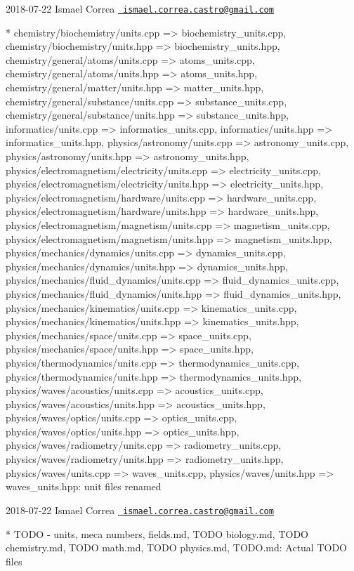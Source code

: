  2018-\/07-\/22 Ismael Correa \href{mailto:ismael.correa.castro@gmail.com}{\texttt{ ismael.\+correa.\+castro@gmail.\+com}} \begin{DoxyVerb}* chemistry/biochemistry/{units.cpp => biochemistry_units.cpp},
chemistry/biochemistry/{units.hpp => biochemistry_units.hpp},
chemistry/general/atoms/{units.cpp => atoms_units.cpp},
chemistry/general/atoms/{units.hpp => atoms_units.hpp},
chemistry/general/matter/{units.hpp => matter_units.hpp},
chemistry/general/substance/{units.cpp => substance_units.cpp},
chemistry/general/substance/{units.hpp => substance_units.hpp},
informatics/{units.cpp => informatics_units.cpp},
informatics/{units.hpp => informatics_units.hpp},
physics/astronomy/{units.cpp => astronomy_units.cpp},
physics/astronomy/{units.hpp => astronomy_units.hpp},
physics/electromagnetism/electricity/{units.cpp =>
electricity_units.cpp},
physics/electromagnetism/electricity/{units.hpp =>
electricity_units.hpp},
physics/electromagnetism/hardware/{units.cpp =>
hardware_units.cpp}, physics/electromagnetism/hardware/{units.hpp
=> hardware_units.hpp},
physics/electromagnetism/magnetism/{units.cpp =>
magnetism_units.cpp}, physics/electromagnetism/magnetism/{units.hpp
=> magnetism_units.hpp}, physics/mechanics/dynamics/{units.cpp =>
dynamics_units.cpp}, physics/mechanics/dynamics/{units.hpp =>
dynamics_units.hpp}, physics/mechanics/fluid_dynamics/{units.cpp =>
fluid_dynamics_units.cpp},
physics/mechanics/fluid_dynamics/{units.hpp =>
fluid_dynamics_units.hpp}, physics/mechanics/kinematics/{units.cpp
=> kinematics_units.cpp}, physics/mechanics/kinematics/{units.hpp
=> kinematics_units.hpp}, physics/mechanics/space/{units.cpp =>
space_units.cpp}, physics/mechanics/space/{units.hpp =>
space_units.hpp}, physics/thermodynamics/{units.cpp =>
thermodynamics_units.cpp}, physics/thermodynamics/{units.hpp =>
thermodynamics_units.hpp}, physics/waves/acoustics/{units.cpp =>
acoustics_units.cpp}, physics/waves/acoustics/{units.hpp =>
acoustics_units.hpp}, physics/waves/optics/{units.cpp =>
optics_units.cpp}, physics/waves/optics/{units.hpp =>
optics_units.hpp}, physics/waves/radiometry/{units.cpp =>
radiometry_units.cpp}, physics/waves/radiometry/{units.hpp =>
radiometry_units.hpp}, physics/waves/{units.cpp =>
waves_units.cpp}, physics/waves/{units.hpp => waves_units.hpp}: unit
files renamed
\end{DoxyVerb}
 2018-\/07-\/22 Ismael Correa \href{mailto:ismael.correa.castro@gmail.com}{\texttt{ ismael.\+correa.\+castro@gmail.\+com}} \begin{DoxyVerb}* TODO - units, meca numbers, fields.md, TODO biology.md, TODO
chemistry.md, TODO math.md, TODO physics.md, TODO.md: Actual TODO
files
\end{DoxyVerb}
